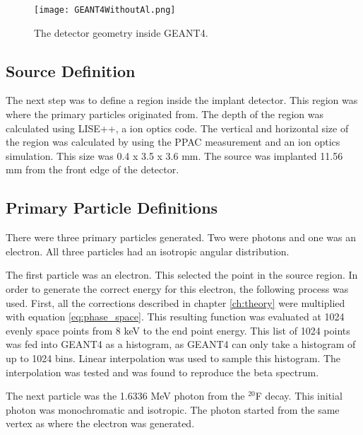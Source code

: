 \documentclass[../MaxHughesThesis.tex]{subfiles}
\begin{document}
\begin{figure}[!htb]
	\centerline{\texttt{[image: GEANT4WithoutAl.png]}}
	\caption{The detector geometry inside GEANT4.}
	\label{fig:GEANT4Det}
\end{figure}

\subsection{Source Definition}
The next step was to define a region inside the implant detector.
This region was where the primary particles originated from.
The depth of the region was calculated using LISE++, a ion optics code.
The vertical and horizontal size of the region was calculated by using the PPAC measurement and an ion optics simulation.
This size was 0.4 x 3.5 x 3.6 mm.
The source was implanted 11.56 mm from the front edge of the detector.

\subsection{Primary Particle Definitions}
There were three primary particles generated.
Two were photons and one was an electron.
All three particles had an isotropic angular distribution.

The first particle was an electron. 
This selected the point in the source region.
In order to generate the correct energy for this electron, the following process was used.
First, all the corrections described in chapter \ref{ch:theory} were multiplied with equation \ref{eq:phase_space}.
This resulting function was evaluated at 1024 evenly space points from 8 keV to the end point energy.
This list of 1024 points was fed into GEANT4 as a histogram, as GEANT4 can only take a histogram of up to 1024 bins. 
Linear interpolation was used to sample this histogram.
The interpolation was tested and was found to reproduce the beta spectrum.

The next particle was the 1.6336 MeV photon from the $^{20}$F decay.
This initial photon was monochromatic and isotropic.
The photon started from the same vertex as where the electron was generated.
\end{document}

